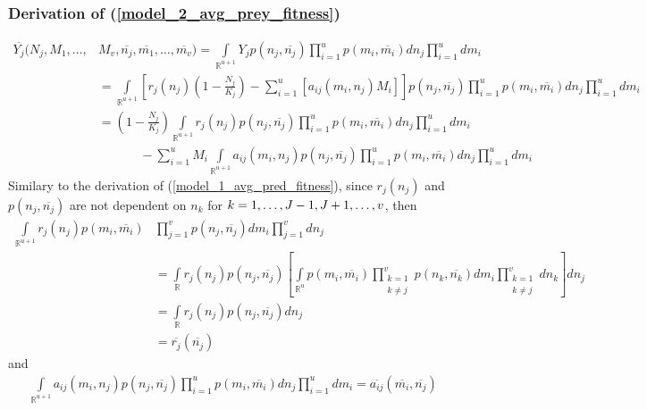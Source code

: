 \documentclass{amsart}
\theoremstyle{definition}
\theoremstyle{remark}
\numberwithin{equation}{section}
\begin{document}
\subsubsection{Derivation of (\ref{model_2_avg_prey_fitness})}
\begin{align*}
	\overline{Y_j}(N_j, M_1, \dots, &M_v, \overline{n_j}, \overline{m_1}, \dots, \overline{m_v}) = \int\limits_{\mathbb{R}^{u+1}}^{}Y_jp(n_j, \overline{n_j})\prod\limits_{i = 1}^{u}p(m_i, \overline{m_i})dn_j\prod\limits_{i = 1}^{u}dm_i \\
	&= \int\limits_{\mathbb{R}^{u+1}}\left[r_j(n_j)\left(1 - \frac{N_j}{K_j}\right) - \sum\limits_{i = 1}^{u}\left[a_{ij}(m_i, n_j)M_i\right]\right]p(n_j, \overline{n_j})\prod\limits_{i = 1}^{u}p(m_i, \overline{m_i})dn_j\prod\limits_{i = 1}^{u}dm_i \\
	&= \left(1 - \frac{N_j}{K_j}\right)\int\limits_{\mathbb{R}^{u+1}}r_j(n_j)p(n_j, \overline{n_j})\prod\limits_{i = 1}^{u}p(m_i, \overline{m_i})dn_j\prod\limits_{i = 1}^{u}dm_i \\
	&\ \ \ \ \ \ \ \ \ \ \ \ \ \ \ - \sum\limits_{i=1}^{u}M_i\int\limits_{\mathbb{R}^{u+1}}a_{ij}(m_i, n_j)p(n_j, \overline{n_j})\prod\limits_{i = 1}^{u}p(m_i, \overline{m_i})dn_j\prod\limits_{i = 1}^{u}dm_i
\end{align*}
Similary to the derivation of (\ref{model_1_avg_pred_fitness}), since $r_j(n_j)$ and $p(n_j, \overline{n_j})$ are not dependent on $n_k$ for $k = 1, \dots, J-1, J+1, \dots, v$, then 
\begin{align*}
	\int\limits_{\mathbb{R}^{u+1}}^{}r_j(n_j)p(m_i, \overline{m_i})&\prod\limits_{j = 1}^{v}p(n_j, \overline{n_j})dm_i\prod\limits_{j = 1}^{v}dn_j \\
	&= \int\limits_{\mathbb{R}}r_j(n_j)p(n_j, \overline{n_j})\left[\int\limits_{\mathbb{R}^{u}}p(m_i, \overline{m_i})\prod\limits_{\substack{k=1\\k\neq j}}^{v}p(n_k, \overline{n_k})dm_i\prod\limits_{\substack{k=1\\k\neq j}}^{v}dn_k\right]dn_j \\
	&= \int\limits_{\mathbb{R}}r_j(n_j)p(n_j, \overline{n_j})dn_j \\
	&= \overline{r_j}(\overline{n_j})
\end{align*}
and
\begin{align*}
	\int\limits_{\mathbb{R}^{u+1}}a_{ij}(m_i, n_j)p(n_j, \overline{n_j})\prod\limits_{i = 1}^{u}p(m_i, \overline{m_i})dn_j\prod\limits_{i = 1}^{u}dm_i = \overline{a_{ij}}(\overline{m_i}, \overline{n_j})
\end{align*}
\end{document}
